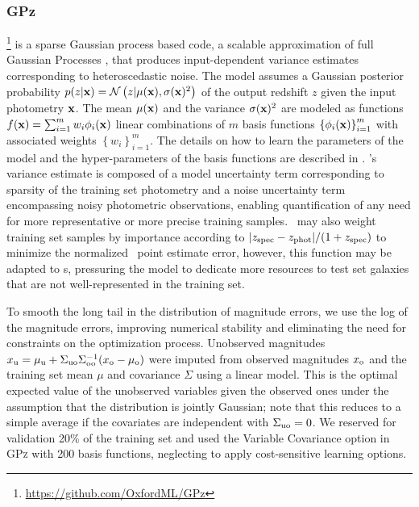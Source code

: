 \subsubsection{GPz}
\label{sec:gpz}

\gpz \footnote{\url{https://github.com/OxfordML/GPz}} \citep{Almosallam:16a,Almosallam:15b} is a sparse Gaussian process based code, a scalable approximation of full Gaussian Processes \citep{Rasmussen:06}, that produces input-dependent variance estimates corresponding to heteroscedastic noise.
The model assumes a Gaussian posterior probability $p(z \vert {\mathbf{x}}) = \mathcal{N}\left(z \vert \mu({\mathbf{x}}), \sigma({\mathbf{x}})^{2}\right)$ of the output redshift $z$ given the input photometry ${\mathbf{x}}$.
The mean $\mu({\mathbf{x}})$ and the variance $\sigma({\mathbf{x}})^{2}$ are modeled as functions $f({\mathbf{x}}) = \sum_{i=1}^{m}w_{i}\phi_{i}({\mathbf{x}})$ linear combinations of $m$ basis functions $\left\{\phi_{i}({\mathbf{x}})\right\}_{i=1}^{m}$ with associated weights $\left\{w_{i}\right\}_{i=1}^{m}$.
The details on how to learn the parameters of the model and the hyper-parameters of the basis functions are described in \citet{Almosallam:15b}.
\gpz's variance estimate is composed of a model uncertainty term corresponding to sparsity of the training set photometry and a noise uncertainty term encompassing noisy photometric observations, enabling quantification of any need for more representative or more precise training samples.
\gpz\ may also weight training set samples by importance according to $|z_{\rm{spec}} - z_{\rm{phot}}| / (1+z_{\rm{spec}})$ to minimize the normalized \pz\ point estimate error, however, this function may be adapted to \pzpdf s, pressuring the model to dedicate more resources to test set galaxies that are not well-represented in the training set.

To smooth the long tail in the distribution of magnitude errors, we use the log of the magnitude errors, improving numerical stability and eliminating the need for constraints on the optimization process.
Unobserved magnitudes $x_{\rm u} = \mu_{\rm u} + \Sigma_{\rm uo}\Sigma_{\rm oo}^{-1}(x_{\rm o} - \mu_{\rm o})$ were imputed from observed magnitudes $x_{\rm o}$ and the training set mean $\mu$ and covariance $\Sigma$ using a linear model.
This is the optimal expected value of the unobserved variables given the observed ones under the assumption that the distribution is jointly Gaussian; note that this reduces to a simple average if the covariates are independent with $\Sigma_{\rm uo} = 0$.
We reserved for validation 20\% of the training set and used the Variable Covariance option in \textsc{GPz} with 200 basis functions, neglecting to apply cost-sensitive learning options.

